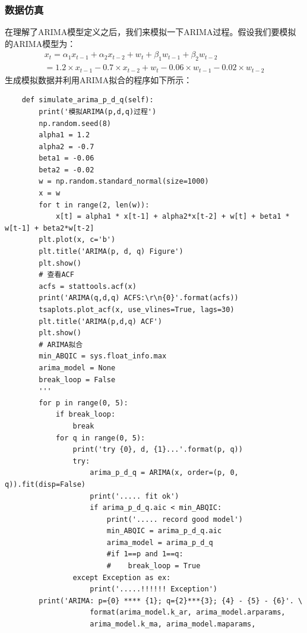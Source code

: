 \documentclass{article}
\begin{document}
\subsubsection{数据仿真}
在理解了ARIMA模型定义之后，我们来模拟一下ARIMA过程。假设我们要模拟的ARIMA模型为：
\begin{equation}
\begin{aligned}
x_{t}=\alpha _{1}x_{t-1} + \alpha _{2}x_{t-2} + w_{t} + \beta _1w_{t-1} + \beta _2w_{t-2} \\
=1.2 \times x_{t-1} - 0.7 \times x_{t-2} + w_{t} - 0.06 \times w_{t-1} - 0.02 \times w_{t-2}
\end{aligned}
\label{e000035}
\end{equation}
生成模拟数据并利用ARIMA拟合的程序如下所示：
\begin{lstlisting}
    def simulate_arima_p_d_q(self):
        print('模拟ARIMA(p,d,q)过程')
        np.random.seed(8)
        alpha1 = 1.2
        alpha2 = -0.7
        beta1 = -0.06
        beta2 = -0.02
        w = np.random.standard_normal(size=1000)
        x = w
        for t in range(2, len(w)):
            x[t] = alpha1 * x[t-1] + alpha2*x[t-2] + w[t] + beta1 * w[t-1] + beta2*w[t-2]
        plt.plot(x, c='b')
        plt.title('ARIMA(p, d, q) Figure')
        plt.show()
        # 查看ACF
        acfs = stattools.acf(x)
        print('ARIMA(q,d,q) ACFS:\r\n{0}'.format(acfs))
        tsaplots.plot_acf(x, use_vlines=True, lags=30)
        plt.title('ARIMA(p,d,q) ACF')
        plt.show()
        # ARIMA拟合
        min_ABQIC = sys.float_info.max
        arima_model = None
        break_loop = False
        '''
        for p in range(0, 5):
            if break_loop:
                break
            for q in range(0, 5):
                print('try {0}, d, {1}...'.format(p, q))
                try:
                    arima_p_d_q = ARIMA(x, order=(p, 0, q)).fit(disp=False)
                    print('..... fit ok')
                    if arima_p_d_q.aic < min_ABQIC:
                        print('..... record good model')
                        min_ABQIC = arima_p_d_q.aic
                        arima_model = arima_p_d_q
                        #if 1==p and 1==q:
                        #    break_loop = True
                except Exception as ex:
                    print('.....!!!!!! Exception')
        print('ARIMA: p={0} **** {1}; q={2}***{3}; {4} - {5} - {6}'. \
                    format(arima_model.k_ar, arima_model.arparams, 
                    arima_model.k_ma, arima_model.maparams, 

\end{lstlisting}
\end{document}
